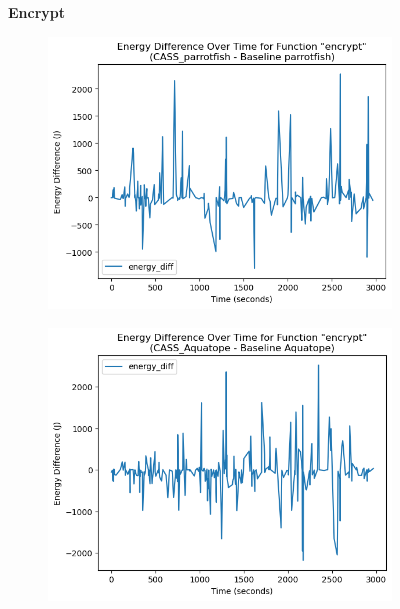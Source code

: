 \documentclass[times, 10pt,twocolumn]{article}
\begin{document}
\begin{figure}[ht]
   \textbf{Encrypt}\par\medskip
   \begin{subfigure}[b]{0.4\textwidth}
      \includegraphics[width=\textwidth]{imgs/final_experiment_plots/energy_comparison/parrotfish/encrypt.png}
     \caption{}
     \label{fig:encrypt_energy_diff_parrotfish}
   \end{subfigure}
   \hfill
   \begin{subfigure}[b]{0.4\textwidth}
      \includegraphics[width=\textwidth]{imgs/final_experiment_plots/energy_comparison/aquatope/encrypt.png}
     \caption{}
     \label{fig:encrypt_energy_diff_aquatope}
   \end{subfigure}
   
   \label{fig:end_to_end_per_invocation_}
 \end{figure}
\end{document}
